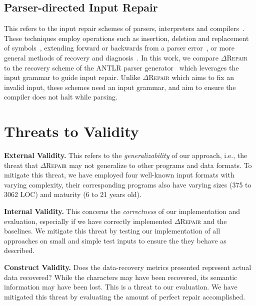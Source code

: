 \documentclass[acmsmall,screen,review,anonymous]{acmart}
\newcommand{\approach}{\textsc{$\Delta$Repair}\xspace}
\begin{document}
\subsection{Parser-directed Input Repair} %
This refers to the input repair schemes of parsers, interpreters and compilers~\cite{parr2011ll, diekmann2020dont, aho1972minimum, hammond1984survey, backhouse1979syntax}. 
These techniques employ operations such as insertion, deletion and replacement of symbols~\cite{anderson1981locally, cerecke2003locally, anderson1983assessment}, extending forward or backwards from a parser error~\cite{burke1982practical, mauney1982forward}, or more general methods of recovery and diagnosis~\cite{krawczyk1980error, aho1972minimum}. 
In this work, we compare \approach to the recovery scheme of the ANTLR parser generator~\cite{parr2011ll} which leverages the input grammar to guide input repair. %
Unlike \approach which aims to fix an invalid input, these schemes need an input grammar, and aim to ensure the compiler does not halt while parsing. 



\section{Threats to Validity}
\label{sec:threats}

\noindent\textbf{External Validity.} This refers to the \textit{generalizability} of our approach, i.e., 
the threat that \approach may not generalize to other programs and data formats. 
To mitigate this threat, we have employed four well-known input formats with varying complexity, their corresponding programs also have  varying sizes (375 to 3062 LOC) and maturity (6 to 21 years old). 

\noindent\textbf{Internal Validity.} This concerns the \textit{correctness} of our implementation and evaluation, especially if we have correctly implemented \approach and the baselines. We mitigate this threat by testing our implementation of all approaches on small and simple test inputs to ensure the they behave as described. 

\noindent\textbf{Construct Validity.} 
Does the data-recovery metrics presented
represent actual data recovered? While the characters may have been recovered,
its semantic information may have been lost. This is a threat to our evaluation.
We have mitigated this threat by evaluating the amount of perfect repair accomplished.
\end{document}
